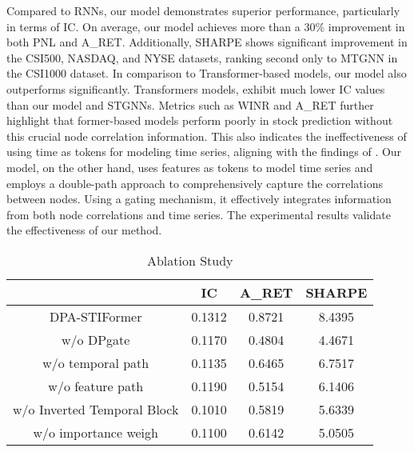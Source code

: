 Compared to RNNs, our model demonstrates superior performance, particularly in terms of IC. On average, our model achieves more than a 30\% improvement in both PNL and A\_RET. Additionally, SHARPE shows significant improvement in the CSI500, NASDAQ, and NYSE datasets, ranking second only to MTGNN in the CSI1000 dataset. In comparison to Transformer-based models, our model also outperforms significantly. Transformers models, exhibit much lower IC values than our model and STGNNs. Metrics such as WINR and A\_RET further highlight that former-based models perform poorly in stock prediction without this crucial node correlation information. This also indicates the ineffectiveness of using time as tokens for modeling time series, aligning with the findings of \citet{itransformer}. Our model, on the other hand, uses features as tokens to model time series and employs a double-path approach to comprehensively capture the correlations between nodes. Using a gating mechanism, it effectively integrates information from both node correlations and time series. The experimental results validate the effectiveness of our method.

\begin{table}[htbp]
  \centering
    \small
    \setlength{\tabcolsep}{1mm}
{
    \begin{tabular}{c|ccc}
    \toprule
          & IC    & A\_RET & SHARPE \\
    \midrule
     DPA-STIFormer    & 0.1312  & 0.8721  & 8.4395  \\
    w/o DPgate & 0.1170  & 0.4804  & 4.4671  \\
    w/o temporal path & 0.1135  & 0.6465  & 6.7517  \\
    w/o feature path & 0.1190  & 0.5154  & 6.1406  \\
    w/o Inverted Temporal Block & 0.1010  & 0.5819  & 5.6339  \\
    w/o importance weigh & 0.1100  & 0.6142  & 5.0505  \\
    \bottomrule
    \end{tabular}%
}
  \label{tab:ablation}%
    \caption{Ablation Study}
\end{table}%


